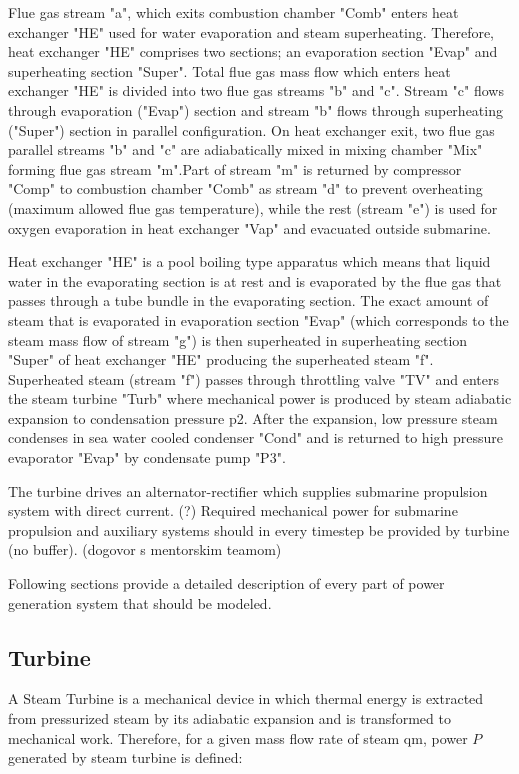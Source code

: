 \documentclass{article}
\begin{document}
	Flue gas stream "a", which exits combustion chamber "Comb" enters heat 
	exchanger "HE" used for water evaporation and steam superheating. 
	Therefore, heat exchanger "HE" comprises two sections; an evaporation 
	section "Evap" and superheating section "Super". Total 
	flue gas mass flow which enters heat exchanger "HE" is divided into two 
	flue gas streams "b" and "c". Stream "c" flows through evaporation ("Evap") 
	section and stream "b" flows through superheating ("Super") section in 
	parallel configuration. On heat exchanger exit, two flue gas parallel 
	streams "b" and "c" are adiabatically mixed in mixing chamber "Mix" forming 
	flue gas stream "m".Part of stream "m" is returned by compressor "Comp" to 
	combustion chamber "Comb" as stream "d" to prevent overheating (maximum 
	allowed flue gas temperature), while the rest (stream "e") is used for 
	oxygen evaporation in heat exchanger "Vap" and evacuated outside submarine.
	  
	Heat exchanger "HE" is a pool boiling type apparatus which means that liquid water in the evaporating section is at rest and is evaporated by the flue gas that passes through a tube bundle in the evaporating section. The exact amount of steam that is evaporated in evaporation section "Evap" (which corresponds to the steam mass flow of stream "g") is then superheated in superheating section "Super" of heat exchanger "HE" producing the superheated steam "f". Superheated steam (stream "f") passes through throttling valve "TV" and enters the steam turbine "Turb" where mechanical power is produced by steam adiabatic expansion to condensation pressure p2. After the expansion, low pressure steam condenses in sea water cooled condenser "Cond" and is returned to high pressure evaporator "Evap" by condensate pump "P3". 
	
	The turbine drives an alternator-rectifier which supplies submarine propulsion system with direct current. (?) Required mechanical power for submarine propulsion and auxiliary systems should in every timestep be provided by turbine (no buffer). (dogovor s mentorskim teamom)
	
	Following sections provide a detailed description of every part of power generation system that should be modeled.
	
	\subsection{Turbine}
	
	A Steam Turbine is a mechanical device in which thermal energy is extracted from pressurized steam by its adiabatic expansion and is transformed to mechanical work.  Therefore, for a given mass flow rate of steam qm, power $P$ generated by steam turbine is defined:
	
\end{document}
